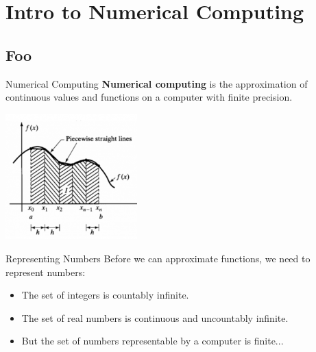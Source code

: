 \documentclass[serif,xcolor=pdftex,dvipsnames,table,hyperref={bookmarks=false,breaklinks}]{beamer}
\begin{document}
%

\section{Intro to Numerical Computing}
\subsection{Foo}

\begin{frame}[t]{Numerical Computing}
	\centering
	\Large{\textbf{Numerical computing} is the approximation of continuous values and functions on a computer with finite precision.}
	
	\includegraphics[width=2in]{../Figures/numerical_integration.png}
\end{frame}

\begin{frame}[t]{Representing Numbers}
	Before we can approximate functions, we need to represent numbers:
	\pause
	\begin{itemize}[<+->]
		\item The set of integers is countably infinite.
		\item The set of real numbers is continuous and uncountably infinite.
		\item But the set of numbers representable by a computer is finite...
	\end{itemize}
\end{frame}
\end{document}
